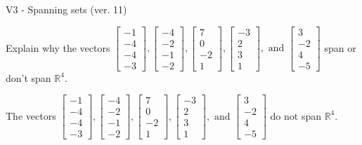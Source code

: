 \begin{exercise}
  \begin{exerciseTitle}V3 - Spanning sets (ver. 11)\end{exerciseTitle}
  \begin{exerciseStatement}
    Explain why the vectors \(\left[\begin{array}{r}
-1 \\
-4 \\
-4 \\
-3
\end{array}\right] , \left[\begin{array}{r}
-4 \\
-2 \\
-1 \\
-2
\end{array}\right] , \left[\begin{array}{r}
7 \\
0 \\
-2 \\
1
\end{array}\right] , \left[\begin{array}{r}
-3 \\
2 \\
3 \\
1
\end{array}\right] , \text{ and } \left[\begin{array}{r}
3 \\
-2 \\
4 \\
-5
\end{array}\right]\) span or don't span \(\mathbb{R}^4\). 
	


  \end{exerciseStatement}
  \begin{exerciseAnswer}
   The vectors \(\left[\begin{array}{r}
-1 \\
-4 \\
-4 \\
-3
\end{array}\right] , \left[\begin{array}{r}
-4 \\
-2 \\
-1 \\
-2
\end{array}\right] , \left[\begin{array}{r}
7 \\
0 \\
-2 \\
1
\end{array}\right] , \left[\begin{array}{r}
-3 \\
2 \\
3 \\
1
\end{array}\right] , \text{ and } \left[\begin{array}{r}
3 \\
-2 \\
4 \\
-5
\end{array}\right]\) 
  	 do not  
	span \(\mathbb{R}^4\).
  



\end{exerciseAnswer}
\end{exercise}
